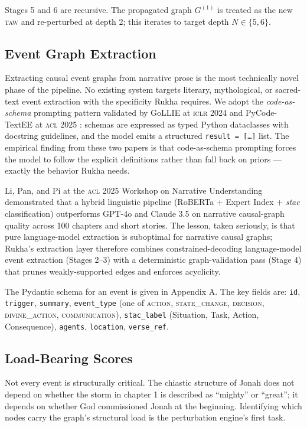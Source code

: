 \documentclass[11pt]{article}
\theoremstyle{rukha}
\begin{document}
Stages 5 and 6 are recursive. The propagated graph $G^{(1)}$ is treated
as the new \textsc{taw} and re-perturbed at depth 2; this iterates to
target depth $N \in \{5, 6\}$.

\subsection{Event Graph Extraction}

Extracting causal event graphs from narrative prose is the most
technically novel phase of the pipeline. No existing system targets
literary, mythological, or sacred-text event extraction with the
specificity Rukha requires. We adopt the \emph{code-as-schema} prompting
pattern validated by GoLLIE at \textsc{iclr} 2024 \cite{gollie} and
PyCode-TextEE at \textsc{acl} 2025 \cite{pycodetexteed}: schemas are
expressed as typed Python dataclasses with docstring guidelines, and the
model emits a structured \texttt{result = [\dots]} list. The empirical
finding from these two papers is that code-as-schema prompting forces
the model to follow the explicit definitions rather than fall back on
priors --- exactly the behavior Rukha needs.

Li, Pan, and Pi at the \textsc{acl} 2025 Workshop on Narrative
Understanding \cite{lihybrid} demonstrated that a hybrid linguistic
pipeline (RoBERTa + Expert Index + \emph{stac} classification) outperforms
GPT-4o and Claude 3.5 on narrative causal-graph quality across 100
chapters and short stories. The lesson, taken seriously, is that pure
language-model extraction is suboptimal for narrative causal graphs;
Rukha's extraction layer therefore combines constrained-decoding language-model
event extraction (Stages 2–3) with a deterministic
graph-validation pass (Stage 4) that prunes weakly-supported edges and
enforces acyclicity.

The Pydantic schema for an event is given in Appendix A. The key
fields are: \texttt{id}, \texttt{trigger}, \texttt{summary},
\texttt{event\_type} (one of \textsc{action}, \textsc{state\_change},
\textsc{decision}, \textsc{divine\_action}, \textsc{communication}),
\texttt{stac\_label} (Situation, Task, Action, Consequence),
\texttt{agents}, \texttt{location}, \texttt{verse\_ref}.

\subsection{Load-Bearing Scores}

Not every event is structurally critical. The chiastic structure of
Jonah does not depend on whether the storm in chapter 1 is described as
``mighty'' or ``great''; it depends on whether God commissioned Jonah at
the beginning. Identifying which nodes carry the graph's structural
load is the perturbation engine's first task.
\end{document}

